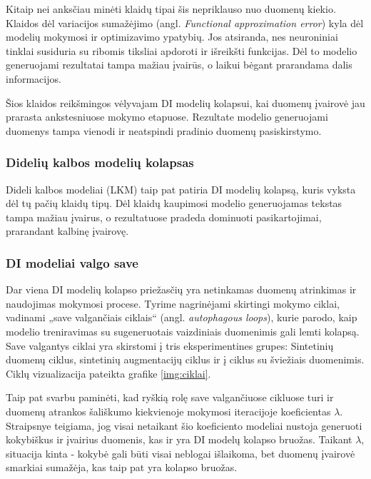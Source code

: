 \documentclass{VUMIFInfKursinis}
\begin{document}
Kitaip nei anksčiau minėti klaidų tipai šis nepriklauso nuo duomenų kiekio. Klaidos dėl variacijos sumažėjimo (angl. \textsl{Functional approximation error}) kyla dėl modelių mokymosi ir optimizavimo ypatybių. Jos atsiranda, nes neuroniniai tinklai susiduria su ribomis tiksliai apdoroti ir išreikšti funkcijas. Dėl to modelio generuojami rezultatai tampa mažiau įvairūs, o laikui bėgant prarandama dalis informacijos.

Šios klaidos reikšmingos vėlyvajam DI modelių kolapsui, kai duomenų įvairovė jau prarasta ankstesniuose mokymo etapuose. Rezultate modelio generuojami duomenys tampa vienodi ir neatspindi pradinio duomenų pasiskirstymo.

\subsubsection{Didelių kalbos modelių kolapsas}

Dideli kalbos modeliai (LKM) taip pat patiria DI modelių kolapsą, kuris vyksta dėl tų pačių klaidų tipų. Dėl klaidų kaupimosi modelio generuojamas tekstas tampa mažiau įvairus, o rezultatuose pradeda dominuoti pasikartojimai, prarandant kalbinę įvairovę.

\subsubsection{DI modeliai valgo save}
Dar viena DI modelių kolapso priežasčių yra netinkamas duomenų atrinkimas ir naudojimas mokymosi procese. Tyrime \cite{ModelsGoMAD} nagrinėjami skirtingi mokymo ciklai, vadinami „save valgančiais ciklais“ (angl. \textsl{autophagous loops}), kurie parodo, kaip modelio treniravimas su sugeneruotais vaizdiniais duomenimis gali lemti kolapsą. Save valgantys ciklai yra skirstomi į tris eksperimentines grupes: Sintetinių duomenų ciklus, sintetinių augmentacijų ciklus ir į ciklus su šviežiais duomenimis. Ciklų vizualizacija pateikta grafike \ref{img:ciklai}.

Taip pat svarbu paminėti, kad ryškią rolę save valgančiuose cikluose turi ir duomenų atrankos šališkumo kiekvienoje mokymosi iteracijoje koeficientas \(\lambda \). Straipsnye teigiama, jog visai netaikant šio koeficiento modeliai nustoja generuoti kokybiškus ir įvairius duomenis, kas ir yra DI modelų kolapso bruožas. Taikant \(\lambda\), situacija kinta - kokybė gali būti visai neblogai išlaikoma, bet duomenų įvairovė smarkiai sumažėja, kas taip pat yra kolapso bruožas. 
\end{document}
